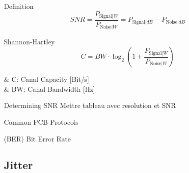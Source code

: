 \begin{frame}{Definition}
    \begin{equation}
        SNR = \frac{P_{\text{Signal}|\unit{W}}}{P_{\text{Noise}|\unit{W}}}=P_{\text{Signal}|\unit{dB}} - P_{\text{Noise}|\unit{dB}}
    \end{equation}
\end{frame}

\begin{frame}{Shannon-Hartley}
    \begin{equation}
        C = BW \cdot \log_{2}\left( 1+\frac{P_{\text{Signal}|\unit{W}}}{P_{\text{Noise}|\unit{W}}} \right)
    \end{equation}
    \begin{makelist}[\small][1.5]
        \icon[blue]{\faCloudversify} & C: Canal Capacity [Bit/s]\\
        \icon[blue]{\faChartArea} & BW: Canal Bandwidth [Hz]
    \end{makelist}
\end{frame}
% 
% 
\begin{frame}{Determining SNR}
    Mettre tableau avec resolution et SNR
\end{frame}

\begin{frame}{Common PCB Protocols}
\end{frame}

\begin{frame}{(BER) Bit Error Rate}
\end{frame}

\subsection[5min-Pascal]{Jitter}
\pascalbackground

